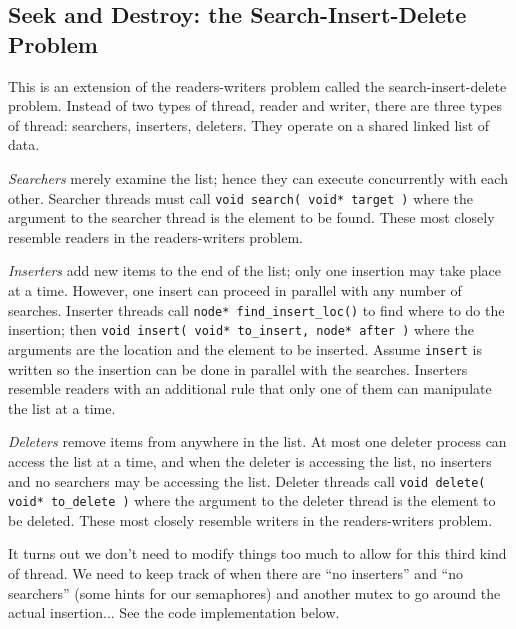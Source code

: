\subsection*{Seek and Destroy: the Search-Insert-Delete Problem}

This is an extension of the readers-writers problem called the search-insert-delete problem. Instead of two types of thread, reader and writer, there are three types of thread: searchers, inserters, deleters. They operate on a shared linked list of data.

\textit{Searchers} merely examine the list; hence they can execute concurrently with each other. Searcher threads must call \texttt{void search( void* target )} where the argument to the searcher thread is the element to be found. These most closely resemble readers in the readers-writers problem.

\textit{Inserters} add new items to the end of the list; only one insertion may take place at a time. However, one insert can proceed in parallel with any number of searches. Inserter threads call \texttt{node* find\_insert\_loc()} to find where to do the insertion; then \texttt{void insert( void* to\_insert, node* after )} where the arguments are the location and the element to be inserted. Assume \texttt{insert} is written so the insertion can be done in parallel with the searches. Inserters resemble readers with an additional rule that only one of them can manipulate the list at a time.

\textit{Deleters} remove items from anywhere in the list. At most one deleter process can access the list at a time, and when the deleter is accessing the list, no inserters and no searchers may be accessing the list. Deleter threads call \texttt{void delete( void* to\_delete )} where the argument to the deleter thread is the element to be deleted. These most closely resemble writers in the readers-writers problem.

It turns out we don't need to modify things too much to allow for this third kind of thread. We need to keep track of when there are ``no inserters'' and ``no searchers'' (some hints for our semaphores) and another mutex to go around the actual insertion... See the code implementation below.

